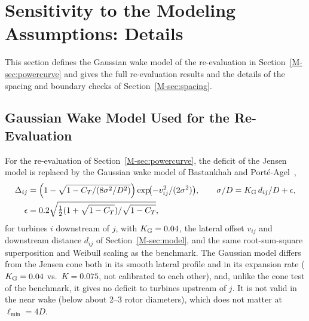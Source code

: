 \documentclass[10pt]{article}
\begin{document}
\section{Sensitivity to the Modeling Assumptions: Details}
\label{sec:S-robust}
This section defines the Gaussian wake model of the re-evaluation in Section~\ref{M-sec:powercurve} and gives the full re-evaluation results and the details of the spacing and boundary checks of Section~\ref{M-sec:spacing}.

\subsection{Gaussian Wake Model Used for the Re-Evaluation}
\label{sec:S-gauss}
For the re-evaluation of Section~\ref{M-sec:powercurve}, the deficit of the Jensen model is replaced by the Gaussian wake model of Bastankhah and Port\'e-Agel~\cite{Bastankhah2014},
\begin{equation}
\begin{split}
\Delta_{ij}&=\Bigl(1-\sqrt{1-C_T/(8\sigma^2/D^2)}\Bigr)\exp\!\bigl(-v_{ij}^2/(2\sigma^2)\bigr),\qquad
\sigma/D=K_{\rm G}\,d_{ij}/D+\epsilon,\\
\epsilon&=0.2\sqrt{\tfrac12(1+\sqrt{1-C_T})/\sqrt{1-C_T}},
\end{split}
\label{eq:S-gauss}
\end{equation}
for turbines $i$ downstream of $j$, with $K_{\rm G}=0.04$, the lateral offset $v_{ij}$ and downstream distance $d_{ij}$ of Section~\ref{M-sec:model}, and the same root-sum-square superposition and Weibull scaling as the benchmark. The Gaussian model differs from the Jensen cone both in its smooth lateral profile and in its expansion rate ($K_{\rm G}=0.04$ vs.\ $K=0.075$, not calibrated to each other), and, unlike the cone test of the benchmark, it gives no deficit to turbines upstream of $j$. It is not valid in the near wake (below about 2--3 rotor diameters), which does not matter at $\ell_{\min}=4D$.

\FloatBarrier
\end{document}
